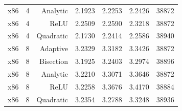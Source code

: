 {\begin{longtable}{lrrrrrr}
x86 & 4 & Analytic & 2.1923 & 2.2253 & 2.2426 & 38872 \\
x86 & 4 & ReLU & 2.2509 & 2.2590 & 2.3218 & 38872 \\
x86 & 4 & Quadratic & 2.1730 & 2.2414 & 2.2586 & 38940 \\
x86 & 8 & Adaptive & 3.2329 & 3.3182 & 3.3426 & 38872 \\
x86 & 8 & Bisection & 3.1925 & 3.2403 & 3.2974 & 38896 \\
x86 & 8 & Analytic & 3.2210 & 3.3071 & 3.3646 & 38872 \\
x86 & 8 & ReLU & 3.2258 & 3.3676 & 3.4170 & 38884 \\
x86 & 8 & Quadratic & 3.2354 & 3.2788 & 3.3248 & 38936 \\
\hline
\end{longtable}}

